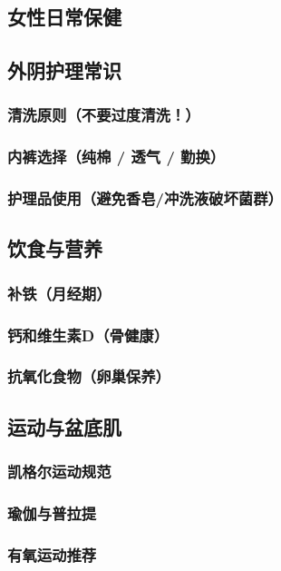\begin{enumerate}
\chapter{女性日常保健}

\section{外阴护理常识}
\subsection{清洗原则（不要过度清洗！）}
\subsection{内裤选择（纯棉 / 透气 / 勤换）}
\subsection{护理品使用（避免香皂/冲洗液破坏菌群）}

\section{饮食与营养}
\subsection{补铁（月经期）}
\subsection{钙和维生素D（骨健康）}
\subsection{抗氧化食物（卵巢保养）}

\section{运动与盆底肌}
\subsection{凯格尔运动规范}
\subsection{瑜伽与普拉提}
\subsection{有氧运动推荐}


\end{enumerate}

